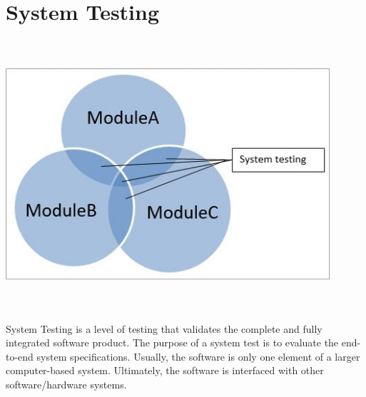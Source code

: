 \section{System Testing}
\begin{center}
    \includegraphics[width=12cm,height=10cm,keepaspectratio]{images/system-testing-example}
\end{center}
System Testing is a level of testing that validates the complete and fully
integrated software product. The purpose of a system test is to evaluate the 
end-to-end system specifications. Usually, the software is only one element of a
larger computer-based system. Ultimately, the software is interfaced with other 
software/hardware systems.